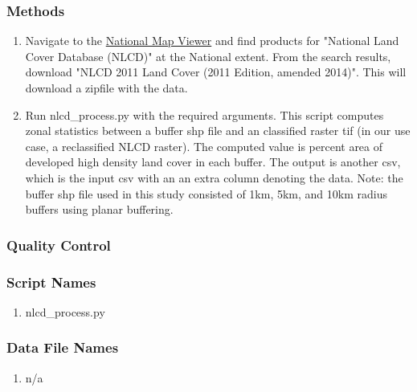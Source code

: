 \subsubsection*{Methods}
\begin{enumerate}
\item Navigate to the \href{https://viewer.nationalmap.gov/basic/}{National Map Viewer} and find products for "National Land Cover Database (NLCD)" at the National extent. From the search results, download "NLCD 2011 Land Cover (2011 Edition, amended 2014)". This will download a zipfile with the data.
\item Run nlcd\_process.py with the required arguments. This script computes zonal statistics between a buffer shp file and an classified raster tif (in our use case, a reclassified NLCD raster). The computed value is percent area of developed high density land cover in each buffer. The output is another csv, which is the input csv with an an extra column denoting the data.
Note: the buffer shp file used in this study consisted of 1km, 5km, and 10km radius buffers using planar buffering.
\end{enumerate}
\subsubsection*{Quality Control}
\subsubsection*{Script Names}
\begin{enumerate}
\item nlcd\_process.py
\end{enumerate}
\subsubsection*{Data File Names}
\begin{enumerate}
\item n/a
\end{enumerate}